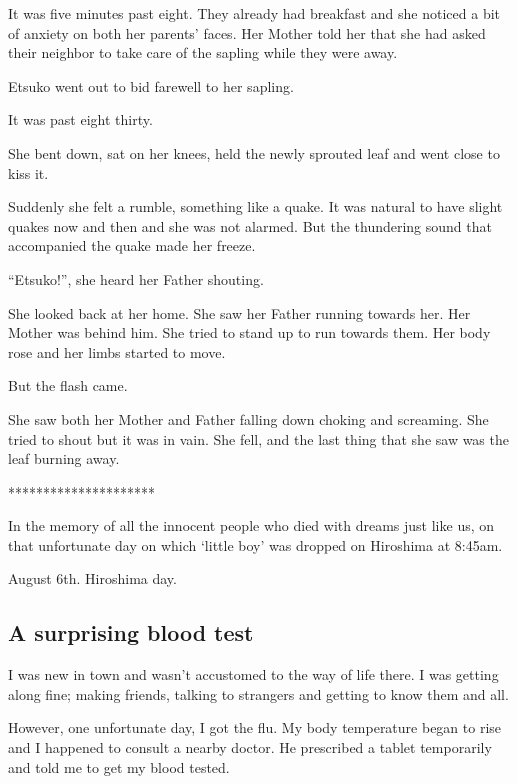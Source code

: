 \documentclass[twoside,11pt,titlepage]{article}
\begin{document}
It was five minutes past eight. They already had breakfast and she noticed a bit of anxiety on both her parents' faces. Her Mother told her that she had asked their neighbor to take care of the sapling while they were away.

 Etsuko went out to bid farewell to her sapling.

 It was past eight thirty.

 She bent down, sat on her knees, held the newly sprouted leaf and went close to kiss it.

Suddenly she felt a rumble, something like a quake. It was natural to have slight quakes now and then and she was not alarmed. But the thundering sound that accompanied the quake made her freeze.

``Etsuko!'', she heard her Father shouting.

She looked back at her home. She saw her Father running towards her. Her Mother was behind him. She tried to stand up to run towards them. Her body rose and her limbs started to move.

But the flash came.

She saw both her Mother and Father falling down choking and screaming. She tried to shout but it was in vain. She fell, and the last thing that she saw was the leaf burning away.

\bigskip
\begin{center}
*********************
\end{center}

 In the memory of all the innocent people who died with dreams just like us, on that unfortunate day on which `little boy' was dropped on Hiroshima at 8:45am.

 August 6th. Hiroshima day.
\newpage

\begin{center}
  \section{A surprising blood test}
\end{center}
\bigskip
\bigskip
\bigskip

I was new in town and wasn't accustomed to the way of life there. I was getting along fine; making friends, talking to strangers and getting to know them and all.

However, one unfortunate day, I got the flu. My body temperature began to rise and I happened to consult a nearby doctor. He prescribed a tablet temporarily and told me to get my blood tested.
\end{document}
